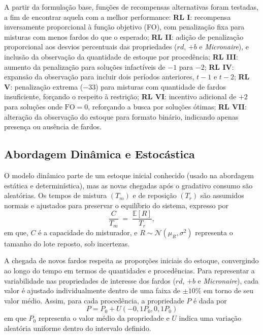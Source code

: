 \documentclass[a4paper,12pt]{article}
\begin{document}
A partir da formulação base, funções de recompensas alternativas foram testadas, a fim de encontrar aquela com a melhor performance: \textbf{RL I}: recompensa inversamente proporcional à função objetivo (FO), com penalização fixa para misturas com menos fardos do que o esperado; \textbf{RL II}: adição de penalização proporcional aos desvios percentuais das propriedades (\(rd\), \(+b\) e \textit{Micronaire}), e inclusão da observação da quantidade de estoque por procedência; \textbf{RL III}: aumento da penalização para soluções infactíveis de \(-1\) para \(-2\); \textbf{RL IV}: expansão da observação para incluir dois períodos anteriores, \(t-1\) e \(t-2\); \textbf{RL V}: penalização extrema (\(-33\)) para misturas com quantidade de fardos insuficiente, forçando o respeito à restrição; \textbf{RL VI}: incentivo adicional de \(+2\) para soluções onde \(\text{FO} = 0\), reforçando a busca por soluções ótimas; \textbf{RL VII}: alteração da observação do estoque para formato binário, indicando apenas presença ou ausência de fardos.

\subsection{Abordagem Dinâmica e Estocástica}

O modelo dinâmico parte de um estoque inicial conhecido (usado na abordagem estática e determinística), mas as novas chegadas após o gradativo consumo são aleatórias. Os tempos de mistura \((T_m)\) e de reposição \((T_r)\) são assumidos normais e ajustados para preservar o equilíbrio do sistema, expresso por
\begin{equation}
\frac{C}{T_m} \;=\; \frac{\mathbb{E}[R]}{T_r},
\end{equation}
em que, \(C\) é a capacidade do misturador, e \(R\sim\mathcal{N}(\mu_R,\sigma^{2})\) representa o tamanho do lote reposto, sob incertezas.

A chegada de novos fardos respeita as proporções iniciais do estoque, convergindo ao longo do tempo em termos de quantidades e procedências. Para representar a variabilidade nas propriedades de interesse dos fardos (\(rd\), \(+b\) e \emph{Micronaire}), cada valor é ajustado individualmente dentro de uma faixa de \(\pm10\%\) em torno de seu valor médio. Assim, para cada procedência, a propriedade \(P\) é dada por
\[
P = P_0 + U(-0{,}1P_0, 0{,}1P_0)
\]
em que \(P_0\) representa o valor médio da propriedade e \(U\) indica uma variação aleatória uniforme dentro do intervalo definido.
\end{document}
